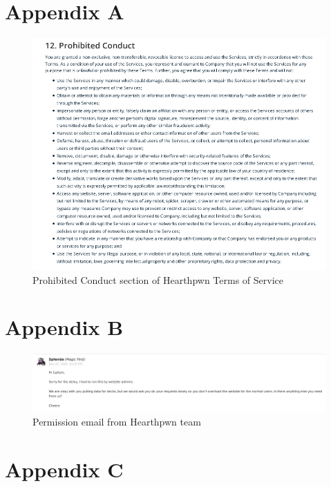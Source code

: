 \documentclass{report} %
\begin{document}
\section*{Appendix A}
\begin{figure}[h]
\centering
\includegraphics[width=1.25\textwidth]{ProhibitedConduct}
\captionsetup{labelformat=empty}
\caption{Prohibited Conduct section of Hearthpwn Terms of Service\protect}
 \label{board}
\end{figure}


\section*{Appendix B}
\begin{figure}[h]
\centering
\includegraphics[width=1.25\textwidth]{permission}
\captionsetup{labelformat=empty}
\caption{Permission email from Hearthpwn team\protect\footnotemark}
 \label{board}
\end{figure}

\section*{Appendix C}

\end{document}
